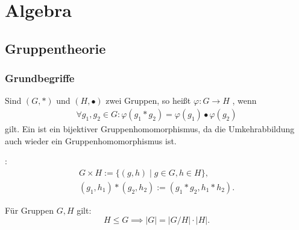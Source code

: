 
\chapter{Algebra}
\section{Gruppentheorie}
\subsection{Grundbegriffe}
\begin{Definition}
Sind $(G,*)$ und $(H,\bullet)$ zwei Gruppen, so
heißt $\varphi\colon G\to H$ 
, wenn
\begin{gather}
\forall g_1,g_2\in G\colon
  \varphi(g_1*g_2) = \varphi(g_1)\bullet\varphi(g_2)
\end{gather}
gilt. Ein 
ist ein bijektiver Gruppenhomomorphismus, da die Umkehrabbildung
auch wieder ein Gruppenhomomorphismus ist.
\end{Definition}
\begin{Definition}
:
\begin{gather}
G\times H := \{(g,h)\mid g\in G, h\in H\},\\
(g_1,h_1)*(g_2,h_2) := (g_1*g_2, h_1*h_2).
\end{gather}
\end{Definition}
\noindent
{} Für Gruppen $G,H$ gilt:
\begin{equation}
H\le G\implies |G| = |G/H|\cdot |H|.
\end{equation}

